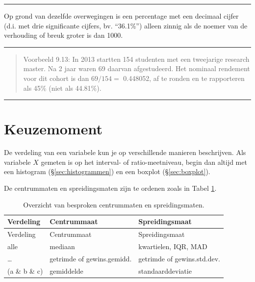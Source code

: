 \documentclass[
]{book}
\begin{document}
\begin{center}\rule{0.5\linewidth}{0.5pt}\end{center}

Op grond van dezelfde overwegingen is een percentage met een decimaal
cijfer (d.i. met drie significante cijfers, bv. ``36.1\%'') alleen zinnig
als de noemer van de verhouding of breuk groter is dan 1000.

\begin{center}\rule{0.5\linewidth}{0.5pt}\end{center}

\begin{quote}
Voorbeeld 9.13:
In 2013 startten 154 studenten met een tweejarige research master. Na 2
jaar waren 69 daarvan afgestudeerd. Het nominaal rendement voor dit
cohort is dan \(69/154=\) 0.448052, af te ronden en te rapporteren als 45\%
(niet als 44.81\%).
\end{quote}

\begin{center}\rule{0.5\linewidth}{0.5pt}\end{center}

\section{Keuzemoment}\label{sec:robuustefficient}

De verdeling van een variabele kun je op verschillende manieren
beschrijven.
Als variabele \(X\) gemeten is op het interval- of ratio-meetniveau,
begin dan altijd met een histogram (§\ref{sec:histogrammen})
en een boxplot (§\ref{sec:boxplot}).

De centrummaten en spreidingsmaten zijn te ordenen zoals in
Tabel \ref{tab:centrumspreidingsmaten}.

\begin{longtable}[]{@{}lll@{}}
\caption{\label{tab:centrumspreidingsmaten} Overzicht van besproken centrummaten en spreidingsmaten.}\tabularnewline
\toprule\noalign{}
Verdeling & Centrummaat & Spreidingsmaat \\
\midrule\noalign{}
\endfirsthead
\toprule\noalign{}
Verdeling & Centrummaat & Spreidingsmaat \\
\midrule\noalign{}
\endhead
\bottomrule\noalign{}
\endlastfoot
alle & mediaan & kwartielen, IQR, MAD \\
\ldots{} & getrimde of gewins.gemidd. & getrimde of gewins.std.dev. \\
(a \& b \& c) & gemiddelde & standaarddeviatie \\
\end{longtable}
\end{document}
